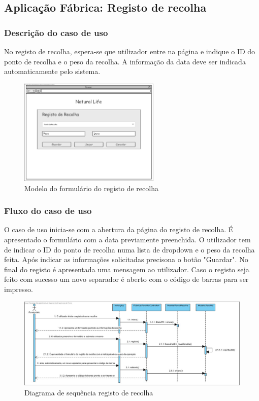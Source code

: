 \subsection{Aplicação Fábrica: Registo de recolha}
\subsubsection*{Descrição do caso de uso}
No registo de recolha, espera-se que utilizador entre na página e indique o ID do ponto de recolha e o peso da recolha. A informação da data deve ser indicada automaticamente pelo sistema. 

\begin{figure}[H] 
	\begin{center}
		\includegraphics[width=0.60\textwidth,keepaspectratio]{figuras/Diagramas_vp/DI_Fabrica_2_Registo_de_Recolha.jpg}
		\caption{Modelo do formulário do registo de recolha}
		\label{fig:di_recolha} 
	\end{center}
\end{figure}

\subsubsection*{Fluxo do caso de uso}
O caso de uso inicia-se com a abertura da página do registo de recolha. É apresentado o formulário com a data previamente preenchida. O utilizador tem de indicar o ID do ponto de recolha numa lista de dropdown e o peso da recolha feita. Após indicar as informações solicitadas precisona o botão "Guardar". No final do registo é apresentada uma mensagem ao utilizador. Caso o registo seja feito com sucesso um novo separador é aberto com o código de barras para ser impresso.


\begin{figure}[H] 
	\begin{center}
		\includegraphics[width=\textwidth,keepaspectratio]{figuras/Diagramas_vp/SD_Fabrica_2_Registo_de_Recolhas.jpg}
		\caption{Diagrama de sequência registo de recolha}
		\label{fig:sd_recolha} 
	\end{center}
\end{figure}